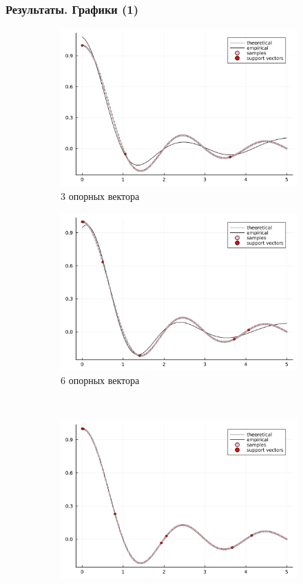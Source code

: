 \documentclass{beamer}
\begin{document}
\begin{frame}
	\frametitle{Результаты. Графики (1)}
	\begin{figure}
		\centering
		\begin{subfigure}{0.4\textwidth}
			\includegraphics[width=\linewidth]{../model3.png}
			\caption{3 опорных вектора}
		\end{subfigure}
		\begin{subfigure}{0.4\textwidth}
			\includegraphics[width=\linewidth]{../model6.png}
			\caption{6 опорных вектора}
		\end{subfigure} \\
		\begin{subfigure}{0.4\textwidth}
			\includegraphics[width=\linewidth]{../model7.png}

\end{subfigure}
\end{figure}
\end{frame}
\end{document}
